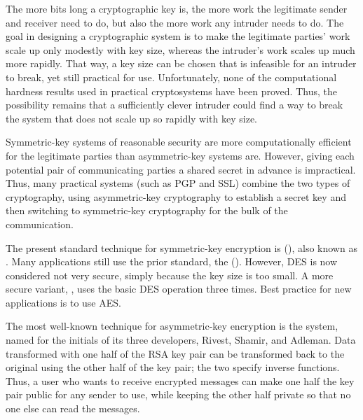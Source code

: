 The more bits long a cryptographic key is, the more work the
legitimate sender and receiver need to do, but also the more work any
intruder needs to do.  The goal in designing a cryptographic system is
to make the legitimate parties' work scale up only modestly with key
size, whereas the intruder's work scales up much more rapidly.  That
way, a key size can be chosen that is infeasible for an intruder to
break, yet still practical for use.  Unfortunately, none of the
computational hardness results used in practical cryptosystems have been proved.
Thus, the possibility remains that a sufficiently clever intruder
could find a way to break the system that does not scale up so rapidly
with key size.

Symmetric-key systems of reasonable security are more computationally
efficient for the legitimate parties than asymmetric-key systems are.
However, giving each potential pair of communicating parties a shared
secret in advance is impractical.  Thus, many practical systems (such
as PGP and SSL) combine the two types of cryptography, using asymmetric-key cryptography to
establish a secret key and then switching to symmetric-key
cryptography for the bulk of the communication.

The present standard
technique for symmetric-key encryption is 
(), also known as .  Many applications still use the
prior standard, the  ().
However, DES is now considered not very secure, simply because the key
size is too small.  A more secure variant, , uses the
basic DES operation three times.  Best practice for new applications
is to use AES.

The most well-known technique for asymmetric-key encryption is the
 system, named for the initials of its three developers,
Rivest, Shamir, and Adleman.  Data transformed with one half of the
RSA key pair can be transformed back to the original using the other
half of the key pair; the two specify inverse functions.  Thus, a user
who wants to receive encrypted messages can make one half the key pair
public for any sender to use, while keeping the other half private so
that no one else can read the messages.


